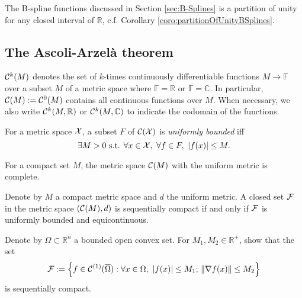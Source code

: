 \begin{exm}
  \label{exm:B-splineAsPartOfUnity}
  The B-spline functions discussed in Section \ref{sec:B-Splines}
  is a partition of unity
  for any closed interval of $\mathbb{R}$,
  c.f. Corollary \ref{coro:partitionOfUnityBSplines}.
\end{exm}

\subsection{The Ascoli-Arzel\`{a} theorem}
\label{sec:ascoli-arzela-theor}


\begin{ntn}
  \label{ntn:setOfContinuousScalarFuncs}
  ${\cal C}^{k}(M)$
  denotes the set of $k$-times continuously differentiable functions
  $M\rightarrow \mathbb{F}$
  over a subset $M$ of a metric space where $\mathbb{F}=\mathbb{R}$
  or $\mathbb{F}=\mathbb{C}$.
  In particular, 
  ${\cal C}(M):={\cal C}^{0}(M)$
  contains all continuous functions over $M$.
  When necessary, we also write ${\cal C}^k(M,\mathbb{R})$
  or ${\cal C}^k(M,\mathbb{C})$
  to indicate the codomain of the functions. 
\end{ntn}

\begin{defn}
  \label{def:uniformBoundedSetInFuncMetricSpace}
  For a metric space ${\cal X}$, 
  a subset $F$ of ${\cal C}({\cal X})$ is \emph{uniformly bounded}
  iff
  \begin{equation}
    \label{eq:uniformBoundedSetInFuncMetricSpace}
    \exists M>0 \text{ s.t. }
    \forall x\in {\cal X},\ \forall f \in F,\ 
    |f(x)| \le M.
  \end{equation}
\end{defn}

\begin{lem}
  \label{lem:completeMetricSpaceForCompactSet}
  For a compact set $M$,
  the metric space ${\cal C}(M)$
  with the uniform metric is complete.
\end{lem}

\begin{thm}
  \label{thm:Ascoli-Arzela}
  Denote by $M$ a compact metric space
  and $d$ the uniform metric. 
  A closed set ${\cal F}$ in the metric space $({\cal C}(M),d)$
  is sequentially compact
  if and only if ${\cal F}$ is uniformly bounded and equicontinuous. 
\end{thm}


\begin{exc}
  \label{exc:equiContInRn2Compact}
  Denote by $\Omega\subset \mathbb{R}^n$ a bounded open convex set.
  For $M_1,M_2\in\mathbb{R}^+$,
  show that the set
  \begin{equation}
    \label{eq:equiContInRn2Compact}
    {\cal F} := \left\{f\in {\cal C}^{(1)}(\overline{\Omega}) :
      \forall x\in \Omega,\ |f(x)|\le M_1;\, 
      \|\nabla f(x)\|\le M_2
    \right\}
  \end{equation}
  is sequentially compact.
\end{exc}


